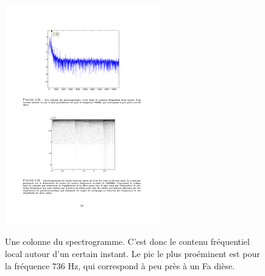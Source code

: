\begin{figure}
  \centering
  \includegraphics[width=0.6\textwidth]{Figures/Figure2-20}\\
  \caption{Une colonne du spectrogramme. C'est donc le contenu fr\'{e}quentiel local autour d'un certain instant. Le pic le plus pro\'{e}minent est pour la fr\'{e}quence $736$ Hz, qui correspond \`{a} peu pr\`{e}s \`{a} un Fa di\`{e}se.}\label{fig:figure2-20}
\end{figure}


